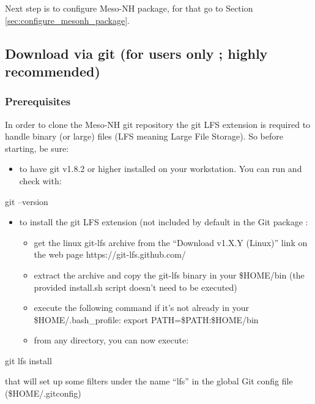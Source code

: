 Next step is to configure Meso-NH package, for that go to Section \ref{sec:configure_mesonh_package}.

\subsection{Download via git (for users only ; highly recommended)}
\label{subsec:mesonh_git}



\subsubsection{Prerequisites}

 In order to clone the Meso-NH git repository the git LFS extension is required to handle binary (or large) files (LFS meaning Large File Storage). So before starting, be sure:
\begin{itemize}
    \item to have git v1.8.2 or higher installed on your workstation. You can run and check with:
\end{itemize}
\begin{bashcode}
 git --version
\end{bashcode}
\begin{itemize}
\item to install the git LFS extension (not included by default in the Git package :
\begin{itemize}
\item get the linux git-lfs archive from the ``Download v1.X.Y (Linux)'' link on the web page https://git-lfs.github.com/
\item extract the archive and copy the git-lfs binary in your \$HOME/bin (the provided install.sh script doesn't need to be executed)
\item execute the following command if it's not already in your \$HOME/.bash\_profile: export PATH=\$PATH:\$HOME/bin
\item from any directory, you can now execute:
\end{itemize}
\end{itemize}
\begin{bashcode}
git lfs install
\end{bashcode}
that will set up some filters under the name ``lfs'' in the global Git config file (\$HOME/.gitconfig)
 

